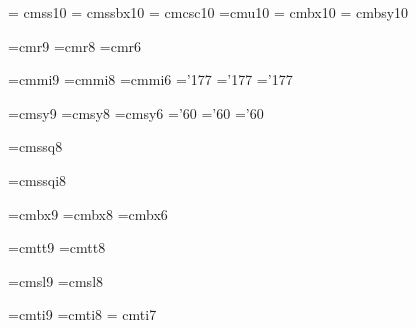 \font\tenss = cmss10 
\font\tenssb = cmssbx10  %
\font\tencsc = cmcsc10 %
\font\tenu=cmu10 %
\font\tenbfx = cmbx10
\font\tenbfy = cmbsy10 %


\font\ninerm=cmr9
\font\eightrm=cmr8
\font\sixrm=cmr6

\font\ninei=cmmi9
\font\eighti=cmmi8
\font\sixi=cmmi6
\skewchar\ninei='177 \skewchar\eighti='177 \skewchar\sixi='177

\font\ninesy=cmsy9
\font\eightsy=cmsy8
\font\sixsy=cmsy6
\skewchar\ninesy='60 \skewchar\eightsy='60 \skewchar\sixsy='60

\font\eightss=cmssq8

\font\eightssi=cmssqi8

\font\ninebfx=cmbx9
\font\eightbfx=cmbx8
\let\sevenbfx = \sevenbf %
\font\sixbfx=cmbx6
\let\fivebfx = \fivebf %

\font\ninett=cmtt9
\font\eighttt=cmtt8

\hyphenchar{} %
\hyphenchar{} 
\hyphenchar{}
\hyphenchar{}

\font\ninesl=cmsl9
\font\eightsl=cmsl8

\font\nineit=cmti9
\font\eightit=cmti8
\font\sevenit= cmti7

\let\notefont = \eighttt



